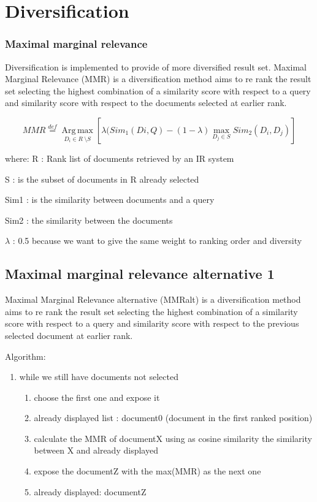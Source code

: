 \section{Diversification}

\subsubsection{Maximal marginal relevance}
Diversification is implemented to provide of more diversified result set. Maximal Marginal Relevance (MMR) is a diversification method aims to re rank the result set selecting the highest combination of a similarity score with respect to a query and similarity score with respect to the documents selected at earlier rank.


\begin{equation}
MMR\overset{def}{=}\operatorname*{Arg\, \max}_{D_{i} \in R\ \setminus S}[\lambda(Sim_{1}(Di,Q)-(1-\lambda)\underset{{D_{j}\in S}}{\max}Sim_{2}(D_{i},D_{j})]
\end{equation}

where:
R : Rank list of documents retrieved by an IR system

S : is the subset of documents in R already selected

Sim1 : is the similarity between documents and a query

Sim2 : the similarity between the documents

$\lambda$ : 0.5 because we want to give the same weight to ranking order and diversity


\subsection{Maximal marginal relevance alternative 1}


Maximal Marginal Relevance alternative (MMRalt) is a diversification method aims to re rank the result set selecting the highest combination of a similarity score with respect to a query and similarity score with respect to the previous selected document at earlier rank.


Algorithm:

\begin{enumerate}
\item while we still have documents not selected
	\begin{enumerate}
	\item choose the first one and expose it
	\item already displayed list : document0 (document in the first ranked position)
	\item calculate the MMR of documentX using as cosine similarity the similarity between X and already displayed
	\item expose the documentZ with the max(MMR) as the next one
	\item already displayed: documentZ
	\end{enumerate}
\end{enumerate}


